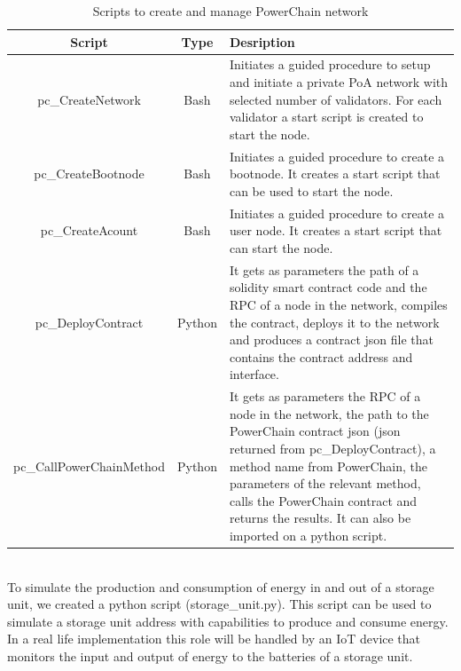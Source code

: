 \begin{table}[h!]
\centering
\begin{tabular}{c|c|p{8cm}}
    \textbf{Script} & \textbf{Type} & \textbf{Desription} \\
    \hline
    pc\_CreateNetwork & Bash & Initiates a guided procedure to setup and initiate a private PoA network with selected number of validators. For each validator a start script is created to start the node. \\
    \hline
    pc\_CreateBootnode & Bash & Initiates a guided procedure to create a bootnode. It creates a start script that can be used to start the node. \\
    \hline
    pc\_CreateAcount & Bash & Initiates a guided procedure to create a user node. It creates a start script that can start the node. \\
    \hline
    pc\_DeployContract & Python & It gets as parameters the path of a solidity smart contract code and the RPC of a node in the network, compiles the contract, deploys it to the network and produces a contract json file that contains the contract address and interface. \\
    \hline
    pc\_CallPowerChainMethod & Python & It gets as parameters the RPC of a node in the network, the path to the PowerChain contract json (json returned from pc\_DeployContract), a method name from PowerChain, the parameters of the relevant method, calls the PowerChain contract and returns the results. It can also be imported on a python script. \\ 
\end{tabular}
\caption{Scripts to create and manage PowerChain network}
\end{table}\\ 

To simulate the production and consumption of energy in and out of a storage unit, we created a python script (storage\_unit.py). 
This script can be used to simulate a storage unit address with capabilities to produce and consume energy. 
In a real life implementation this role will be handled by an IoT device that monitors the input and output of energy to the batteries of a storage unit.

\pagebreak


